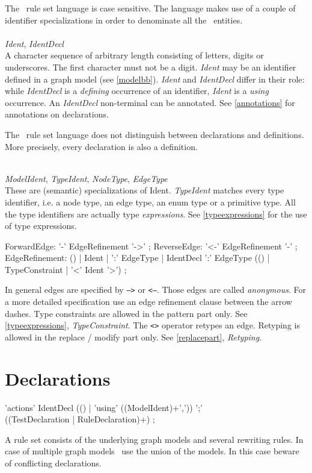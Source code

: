 The \GrG\ rule set language is case sensitive. The language makes use of a couple of identifier specializations in order to denominate all the \GrG\ entities.\\
\\
\emph{Ident}, \emph{IdentDecl}\\ \nopagebreak
A character sequence of arbitrary length consisting of letters, digits or underscores. The first character must not be a digit. \emph{Ident} may be an identifier defined in a graph model (see \ref{modelbb}). \emph{Ident} and \emph{IdentDecl} differ in their role: while \emph{IdentDecl} is a \emph{defining} occurrence of an identifier, \emph{Ident} is a \emph{using} occurrence. An \emph{IdentDecl} non-terminal can be annotated. See \ref{annotations} for annotations on declarations.
\begin{note}
  The \GrG\ rule set language does not distinguish between declarations and definitions. More precisely, every declaration is also a definition.
\end{note}
\mbox{ }\\
\emph{ModelIdent}, \emph{TypeIdent}, \emph{NodeType}, \emph{EdgeType}\\
These are (semantic) specializations of Ident. \emph{TypeIdent} matches every type identifier, i.e. a node type, an edge type, an enum type or a primitive type. All the type identifiers are actually type \emph{expressions}. See \ref{typeexpressions} for the use of type expressions.\\

\begin{rail}
  ForwardEdge: '-' EdgeRefinement '->' ;
  ReverseEdge: '<-' EdgeRefinement '-' ;  
  EdgeRefinement: () | Ident | ':' EdgeType | IdentDecl ':' EdgeType (() | TypeConstraint | '<' Ident '>') ;
\end{rail}
In general edges are specified by \texttt{-->} or \texttt{<--}. Those edges are called \emph{anonymous}. For a more detailed specification use an edge refinement clause between the arrow dashes. Type constraints are allowed in the pattern part only. See \ref{typeexpressions}, \emph{TypeConstraint}. The \texttt{<>} operator retypes an edge. Retyping is allowed in the replace / modify part only. See \ref{replacepart}, \emph{Retyping}.

\section{Declarations}
\label{ruledecls}
\begin{rail}
  'actions' IdentDecl (() | 'using' ((ModelIdent)+',')) ';' \\ ((TestDeclaration | RuleDeclaration)+) ;
\end{rail}
A rule set consists of the underlying graph models and several rewriting rules. In case of multiple graph models \GrG\ use the union of the models. In this case beware of conflicting declarations.

